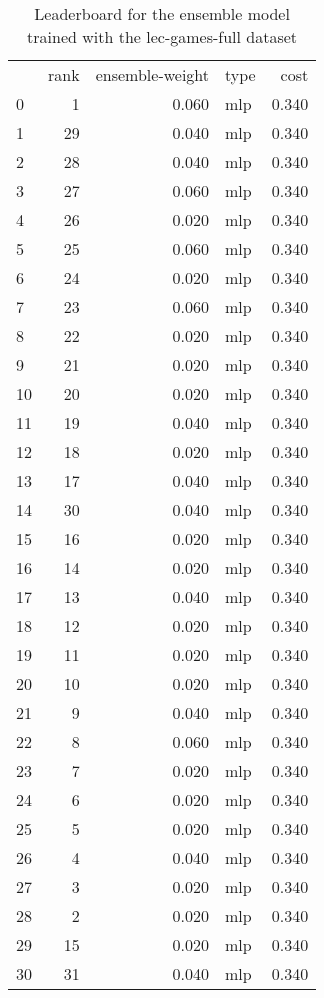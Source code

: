 \begin{table}[]
	\centering
	\begin{tabular}{lrrlr}
		   & rank & ensemble-weight & type & cost  \\
		0  & 1    & 0.060           & mlp  & 0.340 \\
		1  & 29   & 0.040           & mlp  & 0.340 \\
		2  & 28   & 0.040           & mlp  & 0.340 \\
		3  & 27   & 0.060           & mlp  & 0.340 \\
		4  & 26   & 0.020           & mlp  & 0.340 \\
		5  & 25   & 0.060           & mlp  & 0.340 \\
		6  & 24   & 0.020           & mlp  & 0.340 \\
		7  & 23   & 0.060           & mlp  & 0.340 \\
		8  & 22   & 0.020           & mlp  & 0.340 \\
		9  & 21   & 0.020           & mlp  & 0.340 \\
		10 & 20   & 0.020           & mlp  & 0.340 \\
		11 & 19   & 0.040           & mlp  & 0.340 \\
		12 & 18   & 0.020           & mlp  & 0.340 \\
		13 & 17   & 0.040           & mlp  & 0.340 \\
		14 & 30   & 0.040           & mlp  & 0.340 \\
		15 & 16   & 0.020           & mlp  & 0.340 \\
		16 & 14   & 0.020           & mlp  & 0.340 \\
		17 & 13   & 0.040           & mlp  & 0.340 \\
		18 & 12   & 0.020           & mlp  & 0.340 \\
		19 & 11   & 0.020           & mlp  & 0.340 \\
		20 & 10   & 0.020           & mlp  & 0.340 \\
		21 & 9    & 0.040           & mlp  & 0.340 \\
		22 & 8    & 0.060           & mlp  & 0.340 \\
		23 & 7    & 0.020           & mlp  & 0.340 \\
		24 & 6    & 0.020           & mlp  & 0.340 \\
		25 & 5    & 0.020           & mlp  & 0.340 \\
		26 & 4    & 0.040           & mlp  & 0.340 \\
		27 & 3    & 0.020           & mlp  & 0.340 \\
		28 & 2    & 0.020           & mlp  & 0.340 \\
		29 & 15   & 0.020           & mlp  & 0.340 \\
		30 & 31   & 0.040           & mlp  & 0.340 \\
	\end{tabular}

	\caption{Leaderboard for the ensemble model trained with the lec-games-full dataset}
	\label{tab:lb-lec-games-full-PCA}
\end{table}

